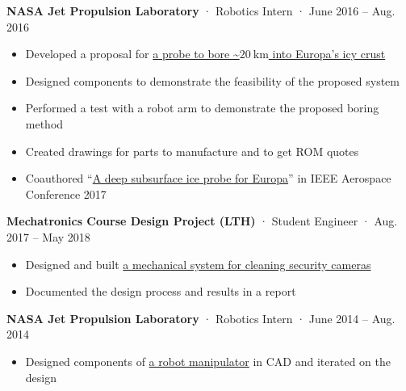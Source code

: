 \documentclass[12pt, oneside]{article}
\newcommand{\jobtitle}[3] {
	{\bf #1} · {#2} · {#3} \vspace{-7pt} \\
}
\begin{document}
\begin{flushleft}
\jobtitle{NASA Jet Propulsion Laboratory}{Robotics Intern}{June 2016 – Aug. 2016}
\begin{itemize}
	\item Developed a proposal for \href{https://portfolium.com/entry/owms-deep-subsurface-access-level-wind}{a probe to bore \textasciitilde$\SI{20}{\kilo\meter}$ into Europa's icy crust}
	\item Designed components to demonstrate the feasibility of the proposed system
	\item Performed a test with a robot arm to demonstrate the proposed boring method
	\item Created drawings for parts to manufacture and to get ROM quotes
	\item Coauthored ``\href{https://ieeexplore-ieee-org.proxy.library.ucsb.edu:9443/stamp/stamp.jsp?tp=&arnumber=7943863}{A deep subsurface ice probe for Europa}'' in IEEE Aerospace Conference 2017
\end{itemize}

\jobtitle{Mechatronics Course Design Project (LTH)}{Student Engineer}{Aug. 2017 – May 2018}
\begin{itemize}
	\item Designed and built \href{https://portfolium.com/entry/automatic-security-camera-lens-cleaner}{a mechanical system for cleaning security cameras}
	\item Documented the design process and results in a report
\end{itemize}

\jobtitle{NASA Jet Propulsion Laboratory}{Robotics Intern}{June 2014 – Aug. 2014}
\begin{itemize}
	\item Designed components of \href{https://portfolium.com/entry/rescue-robots}{a robot manipulator} in CAD and iterated on the design
\end{itemize}



\end{flushleft}
\end{document}
